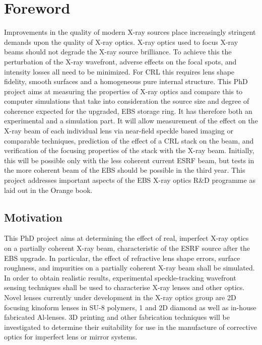 
\chapter*{Foreword}

Improvements in the quality of modern X-ray sources place increasingly stringent demands upon the quality of X-ray optics. X-ray optics used to focus X-ray beams should not degrade the X-ray source brilliance. To achieve this the perturbation of the X-ray wavefront, adverse effects on the focal spots, and intensity losses all need to be minimized. For CRL this requires lens shape fidelity, smooth surfaces and a homogeneous pure internal structure. This PhD project aims at measuring the properties of  X-ray optics and compare this to computer simulations that take into consideration the source size and degree of coherence expected for the upgraded, EBS storage ring. It has therefore both an experimental and a simulation part. It will allow measurement of the effect on the X-ray beam of each individual lens via near-field speckle based imaging or comparable techniques, prediction of the effect of a CRL stack on the beam, and verification of the focusing properties of the stack with the X-ray beam. Initially, this will be possible only with the less coherent current ESRF beam, but tests in the more coherent beam of the EBS should be possible in the third year. This project addresses important aspects of the EBS X-ray optics R$\&$D programme as laid out in the Orange book.

\section*{Motivation}

This PhD project aims at determining the effect of real, imperfect X-ray optics on a partially coherent X-ray beam, characteristic of the ESRF source after the EBS upgrade. In particular, the effect of refractive lens shape errors, surface roughness, and impurities on a partially coherent X-ray beam shall be simulated. In order to obtain realistic results, experimental speckle-tracking wavefront sensing techniques shall be used to characterise X-ray lenses and other optics. Novel lenses currently under development in the X-ray optics group are 2D focusing kinoform lenses in SU-8 polymers, 1 and 2D diamond as well as in-house fabricated Al-lenses. 3D printing and other fabrication techniques will be investigated to determine their suitability for use in the manufacture of corrective optics for imperfect lens or mirror systems.

